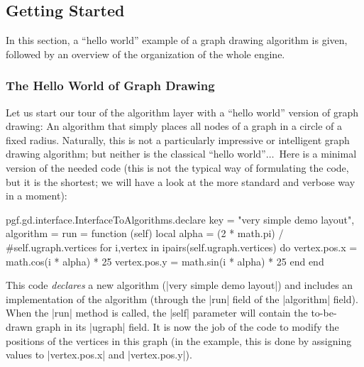 \subsection{Getting Started}

In this section, a ``hello world'' example of a graph drawing algorithm  is
given, followed by an overview of the organization of the whole engine.


\subsubsection{The Hello World of Graph Drawing}

Let us start our tour of the algorithm layer with a ``hello world'' version of
graph drawing: An algorithm that simply places all nodes of a graph in a circle
of a fixed radius. Naturally, this is not a particularly impressive or
intelligent graph drawing algorithm; but neither is the classical ``hello
world''$\dots$\ Here is a minimal version of the needed code (this is not the
typical way of formulating the code, but it is the shortest; we will have a
look at the more standard and verbose way in a moment):
%
\begin{codeexample}[code only, tikz syntax=false]
pgf.gd.interface.InterfaceToAlgorithms.declare {
  key = "very simple demo layout",
  algorithm = {
    run =
      function (self)
        local alpha = (2 * math.pi) / #self.ugraph.vertices
        for i,vertex in ipairs(self.ugraph.vertices) do
          vertex.pos.x = math.cos(i * alpha) * 25
          vertex.pos.y = math.sin(i * alpha) * 25
        end
      end
  }
}
\end{codeexample}

This code \emph {declares} a new algorithm (|very simple demo layout|) and
includes an implementation of the algorithm (through the |run| field of the
|algorithm| field). When the |run| method is called, the |self| parameter will
contain the to-be-drawn graph in its |ugraph| field. It is now the job of the
code to modify the positions of the vertices in this graph (in the example,
this is done by assigning values to |vertex.pos.x| and |vertex.pos.y|).

